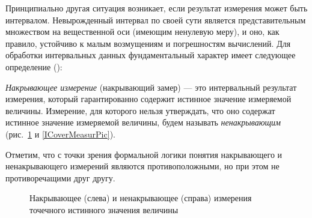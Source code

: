 \documentclass[a5paper,openany]{book}
\begin{document}
Принципиально другая ситуация возникает, если результат измерения может быть интервалом. 
Невырожденный интервал по своей сути является  представительным множеством на  
вещественной оси (имеющим ненулевую меру), и оно, как правило, устойчиво к малым возмущениям и 
погрешностям вычислений. Для обработки интервальных данных 
фундаментальный характер имеет следующее определение (\cite{MetodikaBook, Enclosing2022}):
\begin{definition}
\textsl{Накрывающее измерение} (накрывающий замер) --- это интервальный результат 
измерения, который гарантированно содержит истинное значение измеряемой величины. 
Измерение, для которого нельзя утверждать, что оно содержат истинное значение 
измеряемой величины, будем называть \textsl{ненакрывающим} (рис.~\ref{PCoverMeasurPic} 
и \ref{ICoverMeasurPic}).  
\end{definition}

Отметим, что с точки зрения формальной логики понятия накрывающего и ненакрывающего 
измерений являются противоположными, но при этом не противоречащими друг другу. 


\begin{figure}[!ht]
\unitlength=1mm
\centering\small 
{}
\caption{Накрывающее (слева) и ненакрывающее (справа)	измерения точечного истинного значения величины }
\label{PCoverMeasurPic} 
\end{figure} 
\end{document}
